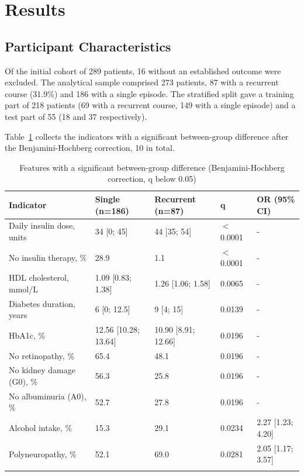\documentclass[pdflatex,sn-basic,Numbered]{sn-jnl}
\begin{document}
\section{Results}\label{sec3}

\subsection{Participant Characteristics}\label{subsec3_1}

Of the initial cohort of 289 patients, 16 without an established outcome were excluded. The analytical sample comprised 273 patients, 87 with a recurrent course (31.9\%) and 186 with a single episode. The stratified split gave a training part of 218 patients (69 with a recurrent course, 149 with a single episode) and a test part of 55 (18 and 37 respectively).

Table~\ref{tab1} collects the indicators with a significant between-group difference after the Benjamini-Hochberg correction, 10 in total.

\begin{table}[h]
\caption{Features with a significant between-group difference (Benjamini-Hochberg correction, q below 0.05)}\label{tab1}%
\begin{tabular}{@{}lllll@{}}
\toprule
Indicator & Single (n=186) & Recurrent (n=87) & q & OR (95\% CI)\\
\midrule
Daily insulin dose, units & 34 [0; 45] & 44 [35; 54] & $<$0.0001 & -\\
No insulin therapy, \% & 28.9 & 1.1 & $<$0.0001 & -\\
HDL cholesterol, mmol/L & 1.09 [0.83; 1.38] & 1.26 [1.06; 1.58] & 0.0065 & -\\
Diabetes duration, years & 6 [0; 12.5] & 9 [4; 15] & 0.0139 & -\\
HbA1c, \% & 12.56 [10.28; 13.64] & 10.90 [8.91; 12.66] & 0.0196 & -\\
No retinopathy, \% & 65.4 & 48.1 & 0.0196 & -\\
No kidney damage (G0), \% & 56.3 & 25.8 & 0.0196 & -\\
No albuminuria (A0), \% & 52.7 & 27.8 & 0.0196 & -\\
Alcohol intake, \% & 15.3 & 29.1 & 0.0234 & 2.27 [1.23; 4.20]\\
Polyneuropathy, \% & 52.1 & 69.0 & 0.0281 & 2.05 [1.17; 3.57]\\
\botrule
\end{tabular}
\end{table}
\end{document}
